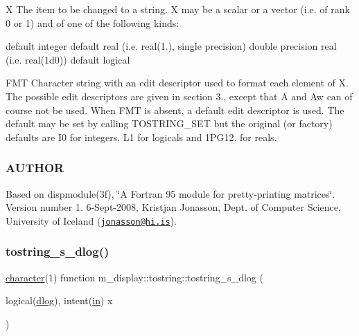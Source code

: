 X The item to be changed to a string. X may be a scalar or a vector (i.\+e. of rank 0 or 1) and of one of the following kinds\+:

default integer default real (i.\+e. real(1.), single precision) double precision real (i.\+e. real(1d0)) default logical

F\+MT Character string with an edit descriptor used to format each element of X. The possible edit descriptors are given in section 3., except that A and Aw can of course not be used. When F\+MT is absent, a default edit descriptor is used. The default may be set by calling T\+O\+S\+T\+R\+I\+N\+G\+\_\+\+S\+ET but the original (or factory) defaults are I0 for integers, L1 for logicals and 1\+P\+G12. for reals.

\subsubsection*{A\+U\+T\+H\+OR}

Based on dispmodule(3f), \char`\"{}\+A Fortran 95 module for pretty-\/printing matrices\char`\"{}. Version number 1. 6-\/\+Sept-\/2008, Kristjan Jonasson, Dept. of Computer Science, University of Iceland (\href{mailto:jonasson@hi.is}{\tt jonasson@hi.\+is}). \mbox{\label{interfacem__display_1_1tostring_a891f31a8821f0aa772158ef6b704f6ac}} 
\subsubsection{\texorpdfstring{tostring\+\_\+s\+\_\+dlog()}{tostring\_s\_dlog()}}
{\footnotesize\ttfamily \hyperlink{option__stopwatch_83_8txt_abd4b21fbbd175834027b5224bfe97e66}{character}(1) function m\+\_\+display\+::tostring\+::tostring\+\_\+s\+\_\+dlog (\begin{DoxyParamCaption}\item[{logical(\hyperlink{namespacem__display_a8c6a3df510feabf6bc84dd0a8789f98c}{dlog}), intent(\hyperlink{M__journal_83_8txt_afce72651d1eed785a2132bee863b2f38}{in})}]{x }\end{DoxyParamCaption})\hspace{0.3cm}{\ttfamily [private]}}

\mbox{\label{interfacem__display_1_1tostring_a9ad4285955a5bfb8db555383b76a2fbc}} 
